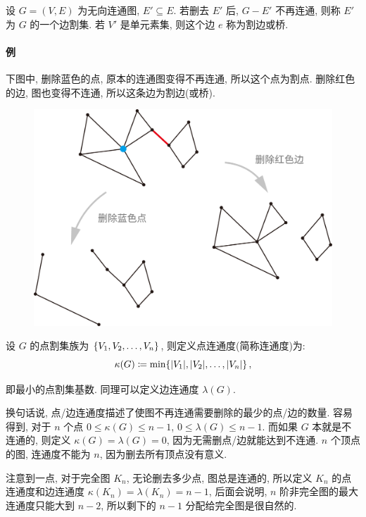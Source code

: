 \documentclass[UTF8]{ctexart}
\theoremstyle{mystyle}
\theoremstyle{myremark}
\theoremstyle{plain}
\DeclarePairedDelimiter\set{\{}{\}}
\begin{document}
\begin{definition}
    设 $ G = (V, E) $ 为无向连通图, $ E' \subseteq E $. 若删去 $ E' $ 后, $ G - E' $ 不再连通, 则称 $ E' $ 为 $ G $ 的一个边割集. 若 $ V' $ 是单元素集, 则这个边 $ e $ 称为割边或桥.
\end{definition}

\paragraph{例}
下图中, 删除蓝色的点, 原本的连通图变得不再连通, 所以这个点为割点. 删除红色的边, 图也变得不连通, 所以这条边为割边(或桥).
\begin{figure}[H]
    \centering
    \includegraphics[width = 0.7\linewidth]{./images/bridge.png}
\end{figure}


\begin{definition}
    设 $ G $ 的点割集族为 $ \set{V_1, V_2, \dots, V_n} $, 则定义点连通度(简称连通度)为:
    \[ \kappa(G) \coloneqq \min\set{|V_1|, |V_2|, \dots, |V_n|} \,,\]

    即最小的点割集基数. 同理可以定义边连通度 $ \lambda(G) $.
\end{definition}

换句话说, 点/边连通度描述了使图不再连通需要删除的最少的点/边的数量. 容易得到, 对于 $ n $ 个点 $ 0 \leqslant \kappa(G) \leqslant n - 1 $, $ 0 \leqslant \lambda(G) \leqslant n - 1 $. 而如果 $ G $ 本就是不连通的, 则定义 $ \kappa(G) = \lambda(G) = 0 $, 因为无需删点/边就能达到不连通. $ n $ 个顶点的图, 连通度不能为 $ n $, 因为删去所有顶点没有意义.

注意到一点, 对于完全图 $ K_n $, 无论删去多少点, 图总是连通的, 所以定义 $ K_n $ 的点连通度和边连通度 $ \kappa(K_n) = \lambda(K_n) = n - 1 $, 后面会说明, $ n $ 阶非完全图的最大连通度只能大到 $ n - 2 $, 所以剩下的 $ n - 1 $ 分配给完全图是很自然的.
\end{document}
